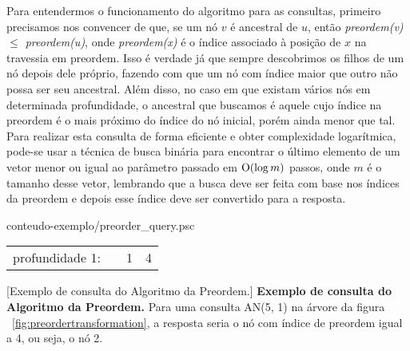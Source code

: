 Para entendermos o funcionamento do algoritmo para as consultas, primeiro precisamos
nos convencer de que, se um nó $v$ é ancestral de $u$, então \textit{preordem(v) $\leq$ preordem(u)},
onde \textit{preordem(x)} é o índice associado à posição de $x$ na travessia em
preordem. Isso é verdade já que sempre descobrimos os filhos de um nó depois dele
próprio, fazendo com que um nó com índice maior que outro não possa ser seu ancestral.
Além disso, no caso em que existam vários nós em determinada profundidade, o ancestral
que buscamos é aquele cujo índice na preordem é o mais próximo do índice do nó inicial,
porém ainda menor que tal. Para realizar esta consulta de forma eficiente e obter
complexidade logarítmica, pode-se usar a técnica de busca binária para encontrar o
último elemento de um vetor menor ou igual ao parâmetro passado em $\mathrm{O}(\log m)$
passos, onde $m$ é o tamanho desse vetor, lembrando que a busca deve ser feita com base
nos índices da preordem e depois esse índice deve ser convertido para a resposta.



\begin{program}[]
  
  {conteudo-exemplo/preorder_query.psc}

  \caption{Consulta do Algoritmo da Preordem.\label{prog:preorderquery}}
\end{program}

\begin{table}[]
  \begin{tabular}{ll|l|l|}
  \cline{3-4}
  profundidade 1: &  & 1 & {\color{red}4} \\ \cline{3-4} 
  \end{tabular}
  [Exemplo de consulta do Algoritmo da Preordem.]
  {\textbf{Exemplo de consulta do Algoritmo da Preordem.} Para uma consulta
  AN(5, 1) na árvore da figura ~\ref{fig:preordertransformation}, a resposta
  seria o nó com índice de preordem igual a 4, ou seja,
  o nó 2.}
  \end{table}

